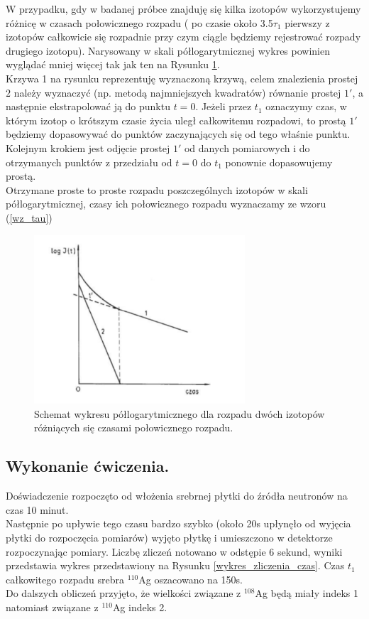 \documentclass{article}
\begin{document}
W przypadku, gdy w badanej próbce znajduję się kilka izotopów wykorzystujemy różnicę w czasach połowicznego rozpadu ( po czasie około 3.5$\tau _1$ pierwszy z izotopów całkowicie się rozpadnie przy czym ciągle będziemy rejestrować rozpady drugiego izotopu). Narysowany w skali półlogarytmicznej wykres powinien wyglądać mniej więcej tak jak ten na Rysunku \ref{schemat}. \\
Krzywa 1 na rysunku reprezentuję wyznaczoną krzywą, celem znalezienia prostej $2$ należy wyznaczyć (np. metodą najmniejszych kwadratów) równanie prostej $1'$, a następnie ekstrapolować ją do punktu $t=0$. Jeżeli przez $t_1$ oznaczymy czas, w którym izotop o krótszym czasie życia uległ całkowitemu rozpadowi, to prostą $1'$ będziemy dopasowywać do punktów zaczynających się od tego właśnie punktu. Kolejnym krokiem jest odjęcie prostej $1'$ od danych pomiarowych i do otrzymanych punktów z przedziału od $t=0$ do $t_1$ ponownie dopasowujemy prostą.\\
Otrzymane proste to proste rozpadu poszczególnych izotopów w skali półlogarytmicznej, czasy ich połowicznego rozpadu wyznaczamy ze wzoru (\ref{wz_tau})

\begin{figure}[h]
	\centering
	\includegraphics[width=0.7\textwidth]{images/schemat.png}
	\caption{Schemat wykresu półlogarytmicznego dla rozpadu dwóch izotopów różniących się czasami połowicznego rozpadu.}
	\label{schemat}
\end{figure}



\subsection{Wykonanie ćwiczenia.}
Doświadczenie rozpoczęto od włożenia srebrnej płytki do źródła neutronów na czas 10 minut.\\
Następnie po upływie tego czasu bardzo szybko (około 20s upłynęło od wyjęcia płytki do rozpoczęcia pomiarów) wyjęto płytkę i umieszczono w detektorze  rozpoczynając pomiary. Liczbę zliczeń notowano w odstępie 6 sekund, wyniki przedstawia  wykres przedstawiony na Rysunku \ref{wykres_zliczenia_czas}. Czas $t_1$ całkowitego rozpadu srebra $^{110}$Ag oszacowano na 150s.\\
Do dalszych obliczeń przyjęto, że wielkości związane z $^{108}$Ag będą miały indeks 1 natomiast związane z $^{110}$Ag indeks 2.\\
\end{document}
